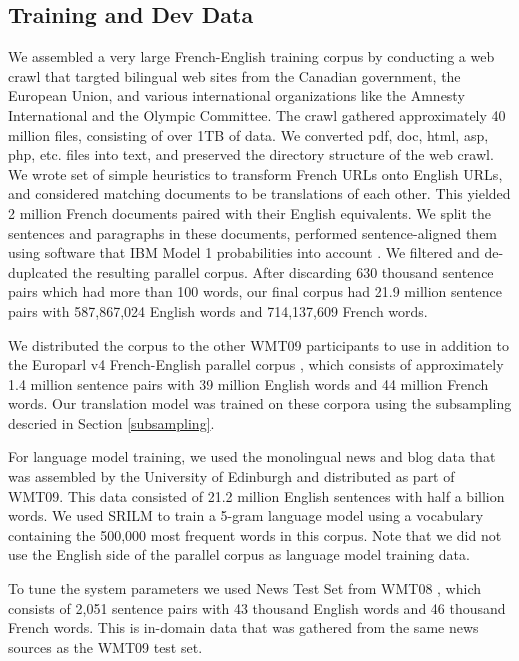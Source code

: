 \documentclass[11pt]{article}
\begin{document}
\subsection{Training and Dev Data}

We assembled a very large French-English training corpus  \cite{billion-word-parallel-corpus} by conducting a web crawl that targted bilingual web sites from the Canadian government, the European Union, and various international organizations like the Amnesty International and the Olympic Committee.  The crawl gathered approximately 40 million files, consisting of over 1TB of data.  We converted pdf, doc, html, asp, php, etc. files into text, and preserved the directory structure of the web crawl.  We wrote set of simple heuristics to transform French URLs onto English URLs, and considered matching documents to be translations of each other.  This yielded 2 million French documents paired with their English equivalents.  We split the sentences and paragraphs in these documents, performed sentence-aligned them using software that IBM Model 1 probabilities into account \cite{Moore2002}.   We filtered and de-duplcated the resulting parallel corpus.  After discarding 630 thousand sentence pairs which had more than 100 words, our final corpus had 21.9 million sentence pairs with 587,867,024 English words and 714,137,609 French words.  

We distributed the corpus to the other WMT09 participants to use in addition to the Europarl v4 French-English parallel corpus \cite{Koehn-europarl}, which consists of approximately 1.4 million sentence pairs with 39 million English words and 44 million French words.  Our translation model was trained on these corpora using the subsampling descried in Section \ref{subsampling}.  

For language model training, we used the monolingual news and blog data that was assembled by the University of Edinburgh and distributed as part of WMT09.  This data consisted of 21.2 million English sentences with half a billion words.  We used SRILM to train a 5-gram language model using a vocabulary containing the 500,000 most frequent words in this corpus.  Note that we did not use the English side of the parallel corpus as language model training data.

To tune the system parameters we used News Test Set from WMT08 \cite{Callison-Burch2008a}, which consists of 2,051 sentence pairs with 43 thousand English words and 46 thousand French words.  This is in-domain data that was gathered from the same news sources as the WMT09 test set.
\end{document}
